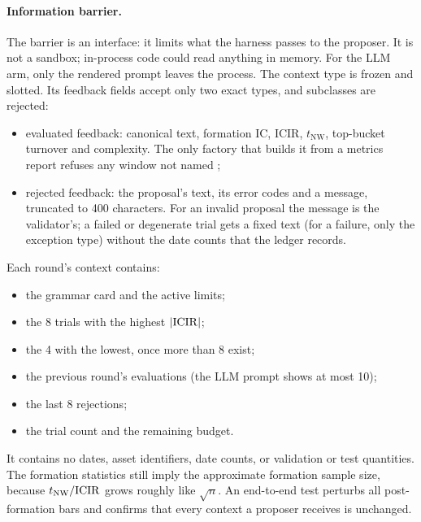 \paragraph{Information barrier.} The barrier is an interface: it limits what
the harness passes to the proposer. It is not a sandbox; in-process code
could read anything in memory. For the LLM arm, only the rendered prompt
leaves the process. The context type is frozen and slotted. Its feedback
fields accept only two exact types, and subclasses are rejected:
\begin{itemize}
  \item evaluated feedback: canonical text, formation IC, ICIR,
    $t_{\mathrm{NW}}$, top-bucket turnover and complexity. The only factory
    that builds it from a metrics report refuses any window not named
    ;
  \item rejected feedback: the proposal's text, its error codes and a
    message, truncated to 400 characters. For an invalid proposal the message
    is the validator's; a failed or degenerate trial gets a fixed text (for a
    failure, only the exception type) without the date counts that the
    ledger records.
\end{itemize}
Each round's context contains:
\begin{itemize}
  \item the grammar card and the active limits;
  \item the 8 trials with the highest $|\mathrm{ICIR}|$;
  \item the 4 with the lowest, once more than 8 exist;
  \item the previous round's evaluations (the LLM prompt shows at most 10);
  \item the last 8 rejections;
  \item the trial count and the remaining budget.
\end{itemize}
It contains no dates, asset identifiers, date counts, or validation or test
quantities. The formation statistics still imply the approximate formation
sample size, because $t_{\mathrm{NW}}/\mathrm{ICIR}$ grows roughly like $\sqrt{n}$. An end-to-end test perturbs all post-formation bars and confirms
that every context a proposer receives is unchanged.

